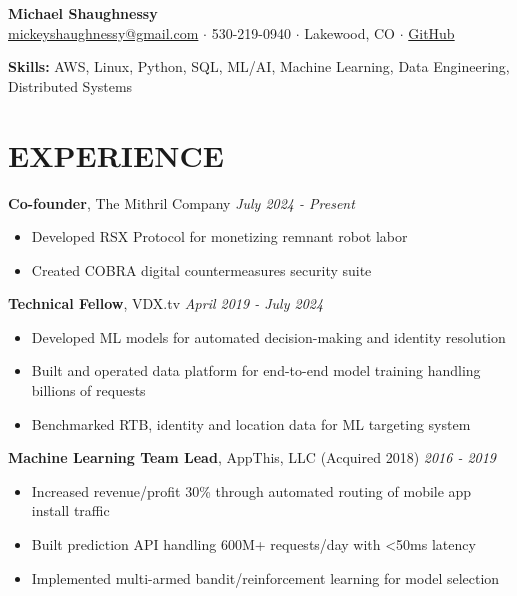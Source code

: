 \documentclass[10pt, letterpaper]{article}
\begin{document}
\begin{center}
{\LARGE \textbf{Michael Shaughnessy}}\\[4pt]
{\color{hyperlinkcolor}\href{mailto:mickeyshaughnessy@gmail.com}{mickeyshaughnessy@gmail.com}} $\cdot$ 
530-219-0940 $\cdot$
Lakewood, CO $\cdot$
{\color{hyperlinkcolor}\href{https://github.com/mickeyshaughnessy}{GitHub}}\\[4pt]
\end{center}

\noindent\textbf{Skills:} AWS, Linux, Python, SQL, ML/AI, Machine Learning, Data Engineering, Distributed Systems

\section{EXPERIENCE}

\noindent\textbf{Co-founder}, {\color{mycolor2}The Mithril Company} \hfill \textit{July 2024 - Present}
\begin{itemize}
\item Developed RSX Protocol for monetizing remnant robot labor
\item Created COBRA digital countermeasures security suite
\end{itemize}

\noindent\textbf{Technical Fellow}, {\color{mycolor2}VDX.tv} \hfill \textit{April 2019 - July 2024}
\begin{itemize}
\item Developed ML models for automated decision-making and identity resolution
\item Built and operated data platform for end-to-end model training handling billions of requests
\item Benchmarked RTB, identity and location data for ML targeting system
\end{itemize}

\noindent\textbf{Machine Learning Team Lead}, {\color{mycolor2}AppThis, LLC} (Acquired 2018) \hfill \textit{2016 - 2019}
\begin{itemize}
\item Increased revenue/profit 30\% through automated routing of mobile app install traffic
\item Built prediction API handling 600M+ requests/day with <50ms latency
\item Implemented multi-armed bandit/reinforcement learning for model selection
\end{itemize}
\end{document}
